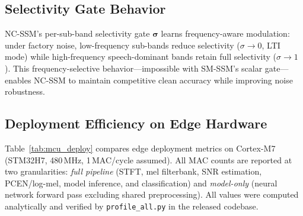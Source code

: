 \documentclass[journal]{IEEEtran}
\begin{document}
\subsection{Selectivity Gate Behavior}

NC-SSM's per-sub-band selectivity gate $\bm{\sigma}$ learns frequency-aware modulation: under factory noise, low-frequency sub-bands reduce selectivity ($\sigma \to 0$, LTI mode) while high-frequency speech-dominant bands retain full selectivity ($\sigma \to 1$).
This frequency-selective behavior---impossible with SM-SSM's scalar gate---enables NC-SSM to maintain competitive clean accuracy while improving noise robustness.

\subsection{Deployment Efficiency on Edge Hardware}
\label{sec:mcu_deploy}

Table~\ref{tab:mcu_deploy} compares edge deployment metrics on Cortex-M7 (STM32H7, 480\,MHz, 1\,MAC/cycle assumed).
All MAC counts are reported at two granularities: \emph{full pipeline} (STFT, mel filterbank, SNR estimation, PCEN/log-mel, model inference, and classification) and \emph{model-only} (neural network forward pass excluding shared preprocessing).
All values were computed analytically and verified by \texttt{profile\_all.py} in the released codebase.
\end{document}
